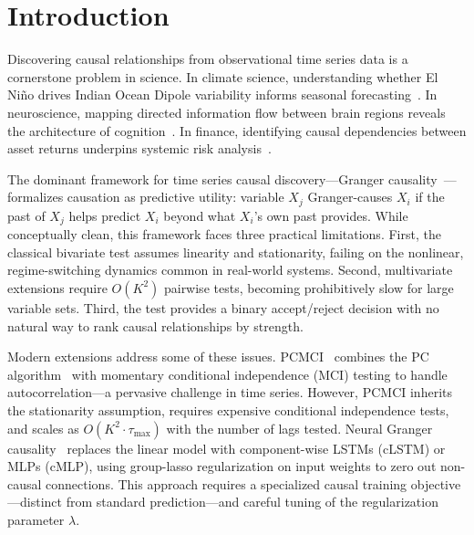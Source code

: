 
\section{Introduction}
\label{sec:intro}

Discovering causal relationships from observational time series data is a
cornerstone problem in science. In climate science, understanding whether
El Ni\~no drives Indian Ocean Dipole variability informs seasonal
forecasting~\citep{runge2019pcmci}. In neuroscience, mapping directed
information flow between brain regions reveals the architecture of
cognition~\citep{seth2015granger}. In finance, identifying causal
dependencies between asset returns underpins systemic risk
analysis~\citep{granger1969investigating}.

The dominant framework for time series causal discovery---Granger
causality~\citep{granger1969investigating}---formalizes causation as
predictive utility: variable $X_j$ Granger-causes $X_i$ if the past of
$X_j$ helps predict $X_i$ beyond what $X_i$'s own past provides. While
conceptually clean, this framework faces three practical limitations.
First, the classical bivariate test assumes linearity and stationarity,
failing on the nonlinear, regime-switching dynamics common in real-world
systems. Second, multivariate extensions require $O(K^2)$ pairwise tests,
becoming prohibitively slow for large variable sets. Third, the test
provides a binary accept/reject decision with no natural way to rank
causal relationships by strength.

Modern extensions address some of these issues. PCMCI~\citep{runge2019pcmci}
combines the PC algorithm~\citep{spirtes2000causation} with momentary
conditional independence (MCI) testing to handle autocorrelation---a
pervasive challenge in time series. However, PCMCI inherits the
stationarity assumption, requires expensive conditional independence
tests, and scales as $O(K^2 \cdot \tau_{\max})$ with the number of lags
tested. Neural Granger causality~\citep{tank2021neural} replaces the
linear model with component-wise LSTMs (cLSTM) or MLPs (cMLP), using
group-lasso regularization on input weights to zero out non-causal
connections. This approach requires a specialized causal training
objective---distinct from standard prediction---and careful tuning of the
regularization parameter $\lambda$.

